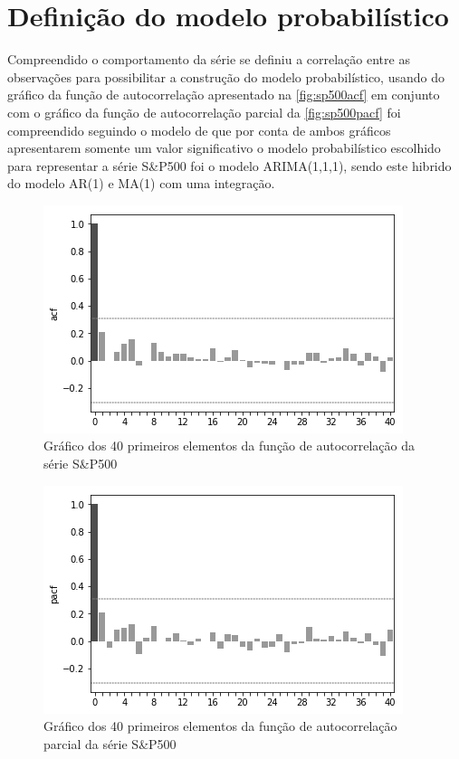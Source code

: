 \documentclass[
    12pt,
    oneside,
    a4paper,
    english,
    brazil
]{abntex2}
\begin{document}
\section{Definição do modelo probabilístico}


Compreendido  o  comportamento  da  série  se definiu  a  correlação  entre  as
observações para possibilitar a construção  do modelo probabilístico, usando do
gráfico  da  função  de autocorrelação  apresentado  na  \autoref{fig:sp500acf}
em   conjunto  com   o  gráfico   da  função   de  autocorrelação   parcial  da
\autoref{fig:sp500pacf} foi compreendido seguindo  o modelo de 
que por conta  de ambos gráficos apresentarem somente um  valor significativo o
modelo probabilístico escolhido  para representar a série S\&P500  foi o modelo
ARIMA(1,1,1), sendo este hibrido do modelo AR(1) e MA(1) com uma integração.

\begin{figure}[ht]
    \centering
    \caption{Gráfico dos 40 primeiros elementos da função de autocorrelação da
    série S\&P500}\label{fig:sp500acf}
    \includegraphics[width=.5\linewidth]{images/sp500acf.png}
\end{figure}

\begin{figure}[ht]
    \centering
    \caption{Gráfico  dos 40  primeiros elementos  da função  de autocorrelação
    parcial da série S\&P500}\label{fig:sp500pacf}
    \includegraphics[width=.5\linewidth]{images/sp500pacf.png}
\end{figure}
\end{document}
